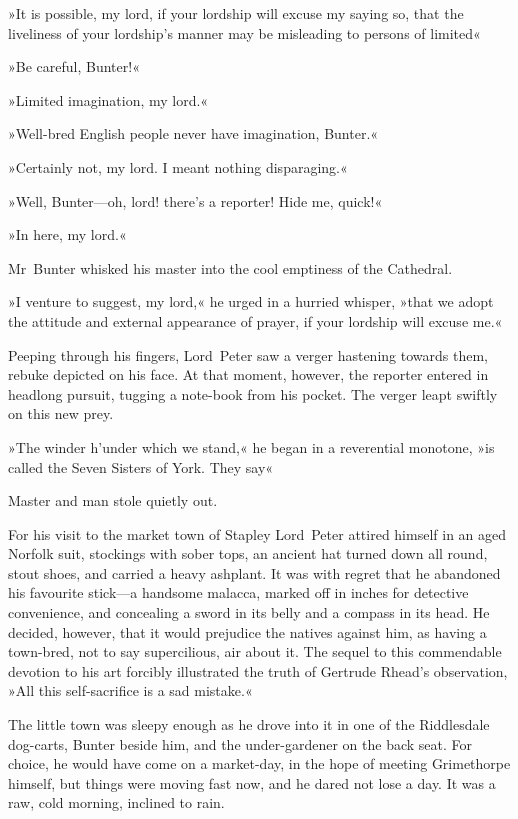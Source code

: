 »It is possible, my lord, if your lordship will excuse my saying so, that the liveliness of your lordship's manner may be misleading to persons of limited\longdash«

»Be careful, Bunter!«

»Limited imagination, my lord.«

»Well-bred English people never have imagination, Bunter.«

»Certainly not, my lord. I meant nothing disparaging.«

»Well, Bunter—oh, lord! there's a reporter! Hide me, quick!«

»In here, my lord.«

Mr~Bunter whisked his master into the cool emptiness of the Cathedral.

»I venture to suggest, my lord,« he urged in a hurried whisper, »that we adopt the attitude and external appearance of prayer, if your lordship will excuse me.«

Peeping through his fingers, Lord~Peter saw a verger hastening towards them, rebuke depicted on his face. At that moment, however, the reporter entered in headlong pursuit, tugging a note-book from his pocket. The verger leapt swiftly on this new prey.

»The winder h'under which we stand,« he began in a reverential monotone, »is called the Seven Sisters of York. They say\longdash«

Master and man stole quietly out.

For his visit to the market town of Stapley Lord~Peter attired himself in an aged Norfolk suit, stockings with sober tops, an ancient hat turned down all round, stout shoes, and carried a heavy ashplant. It was with regret that he abandoned his favourite stick—a handsome malacca, marked off in inches for detective convenience, and concealing a sword in its belly and a compass in its head. He decided, however, that it would prejudice the natives against him, as having a town-bred, not to say supercilious, air about it. The sequel to this commendable devotion to his art forcibly illustrated the truth of Gertrude Rhead's observation, »All this self-sacrifice is a sad mistake.«

The little town was sleepy enough as he drove into it in one of the Riddlesdale dog-carts, Bunter beside him, and the under-gardener on the back seat. For choice, he would have come on a market-day, in the hope of meeting Grimethorpe himself, but things were moving fast now, and he dared not lose a day. It was a raw, cold morning, inclined to rain.


